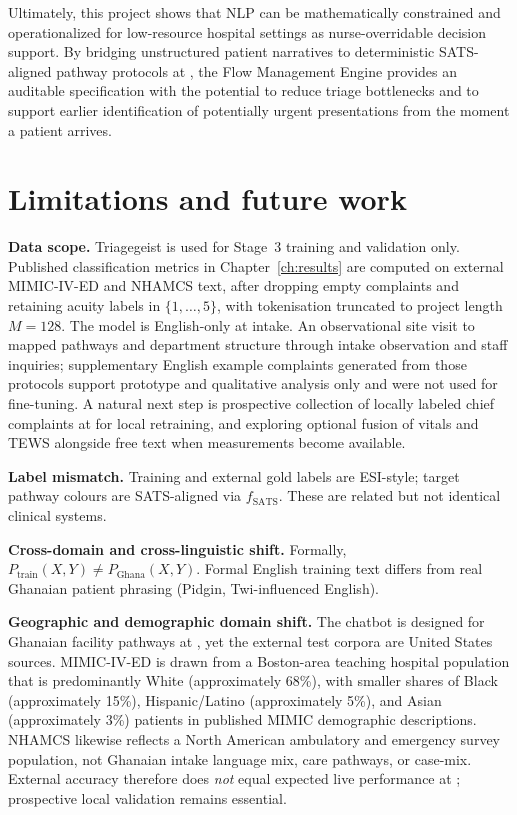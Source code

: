 Ultimately, this project shows that NLP can be mathematically constrained and operationalized for low-resource hospital settings as nurse-overridable decision support. By bridging unstructured patient narratives to deterministic SATS-aligned pathway protocols at \examplehospital{}, the Flow Management Engine provides an auditable specification with the potential to reduce triage bottlenecks and to support earlier identification of potentially urgent presentations from the moment a patient arrives.

\section{Limitations and future work}

\textbf{Data scope.} Triagegeist is used for Stage~3 training and validation only. Published classification metrics in Chapter~\ref{ch:results} are computed on external MIMIC-IV-ED and NHAMCS text, after dropping empty complaints and retaining acuity labels in \(\{1,\ldots,5\}\), with tokenisation truncated to project length \(M=128\). The model is English-only at intake. An observational site visit to \examplehospital{} mapped pathways and department structure through intake observation and staff inquiries; supplementary English example complaints generated from those protocols support prototype and qualitative analysis only and were not used for fine-tuning. A natural next step is prospective collection of locally labeled chief complaints at \examplehospital{} for local retraining, and exploring optional fusion of vitals and TEWS alongside free text when measurements become available.

\textbf{Label mismatch.} Training and external gold labels are ESI-style; target pathway colours are SATS-aligned via \(f_{\mathrm{SATS}}\). These are related but not identical clinical systems.

\textbf{Cross-domain and cross-linguistic shift.} Formally, \(P_{\mathrm{train}}(X,Y)\neq P_{\mathrm{Ghana}}(X,Y)\). Formal English training text differs from real Ghanaian patient phrasing (Pidgin, Twi-influenced English).

\textbf{Geographic and demographic domain shift.} The chatbot is designed for Ghanaian facility pathways at \examplehospital{}, yet the external test corpora are United States sources. MIMIC-IV-ED is drawn from a Boston-area teaching hospital population that is predominantly White (approximately 68\%), with smaller shares of Black (approximately 15\%), Hispanic/Latino (approximately 5\%), and Asian (approximately 3\%) patients in published MIMIC demographic descriptions. NHAMCS likewise reflects a North American ambulatory and emergency survey population, not Ghanaian intake language mix, care pathways, or case-mix. External accuracy therefore does \emph{not} equal expected live performance at \examplehospital{}; prospective local validation remains essential.


